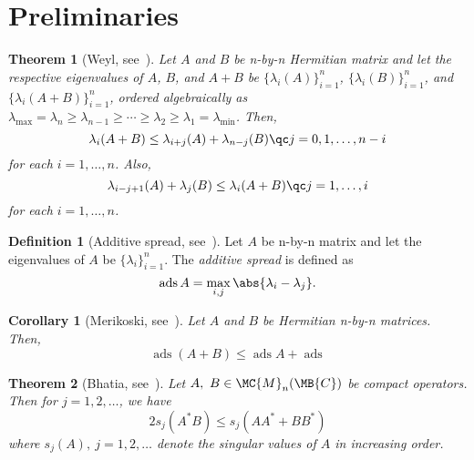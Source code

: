 \documentclass[nobib]{my-handout}
\newtheorem{theorem}{Theorem}
\newtheorem{corollary}{Corollary}
\theoremstyle{definition}
\newtheorem{definition}{Definition}
\theoremstyle{remark}
\DeclareMathOperator{\ads}{ads}
\begin{document}
\section{Preliminaries}

\begin{theorem}[Weyl, see~\cite{horn_matrix_2012}]
	Let $A$ and $B$ be n-by-n Hermitian matrix and let the respective eigenvalues
	of $A$, $B$, and $A+B$ be $\{\lambda_i(A)\}_{i=1}^n$,
	$\{\lambda_i(B)\}_{i=1}^n$, and $\{\lambda_i(A+B)\}_{i=1}^n$, ordered
	algebraically as $\lambda_{\max} = \lambda_n \ge \lambda_{n-1} \ge \cdots \ge
	\lambda_2 \ge \lambda_1 = \lambda_{\min}$. Then,
	\begin{equation*}
		\lambda_i(A+B) \le \lambda_{i+j}(A) + \lambda_{n-j}(B)\qc j=0,1,\dotsc,n-i
	\end{equation*}
	for each $i=1,\dotsc,n$. Also,
	\begin{equation*}
		\lambda_{i-j+1}(A) + \lambda_j(B) \le \lambda_i(A+B)\qc j=1,\dotsc,i
	\end{equation*}
	for each $i=1,\dotsc,n$.
\end{theorem}

\begin{definition}[Additive spread, see~\cite{merikoski_inequalities_2004}]
	Let $A$ be n-by-n matrix and let the eigenvalues of $A$ be
	$\{\lambda_i\}_{i=1}^n$. The \textit{additive spread} is defined as 
	\begin{equation*}
		\ads A = \operatorname*{max}_{i, j} \abs{\lambda_i -
		\lambda_j}.
	\end{equation*}
\end{definition}

\begin{corollary}[Merikoski, see~\cite{merikoski_inequalities_2004}]
	Let $A$ and $B$ be Hermitian n-by-n matrices. Then,
	\begin{equation*}
		\ads (A+B) \le \ads A + \ads
	\end{equation*}
\end{corollary}

\begin{theorem}[Bhatia, see~\cite{bhatia_singular_1990}]
	Let $A,\ B \in \MC{M}_n(\MB{C})$ be compact operators. Then for $j=1,2,\dotsc$,
	we have
	\begin{equation*}
		2 s_j(A^\ast B) \le s_j(AA^\ast + BB^\ast)
	\end{equation*}
	where $s_j(A),\ j=1,2,\dotsc$ denote the singular values of $A$ in increasing
	order.
\end{theorem}
\end{document}
